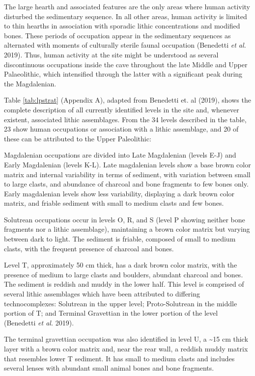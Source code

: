 \documentclass[12pt,twoside]{reedthesis}
\begin{document}
The large hearth and associated features are the only areas where human activity disturbed the sedimentary sequence. In all other areas, human activity is limited to thin hearths in association with sporadic lithic concentrations and modified bones. These periods of occupation appear in the sedimentary sequences as alternated with moments of culturally sterile faunal occupation (Benedetti \emph{et al.} 2019). Thus, human activity at the site might be understood as several discontinuous occupations inside the cave throughout the late Middle and Upper Palaeolithic, which intensified through the latter with a significant peak during the Magdalenian.

Table \ref{tab:lpstrat} (Appendix A), adapted from Benedetti et. al (2019), shows the complete description of all currently identified levels in the site and, whenever existent, associated lithic assemblages. From the 34 levels described in the table, 23 show human occupations or association with a lithic assemblage, and 20 of these can be attributed to the Upper Paleolithic:

Magdalenian occupations are divided into Late Magdalenian (levels E-J) and Early Magdalenian (levels K-L). Late magdalenian levels show a base brown color matrix and internal variability in terms of sediment, with variation between small to large clasts, and abundance of charcoal and bone fragments to few bones only. Early magdalenian levels show less variability, displaying a dark brown color matrix, and friable sediment with small to medium clasts and few bones.

Solutrean occupations occur in levels O, R, and S (level P showing neither bone fragments nor a lithic assemblage), maintaining a brown color matrix but varying between dark to light. The sediment is friable, composed of small to medium clasts, with the frequent presence of charcoal and bones.

Level T, approximately 50 cm thick, has a dark brown color matrix, with the presence of medium to large clasts and boulders, abundant charcoal and bones. The sediment is reddish and muddy in the lower half. This level is comprised of several lithic assemblages which have been attributed to differing technocomplexes: Solutrean in the upper level; Proto-Solutrean in the middle portion of T; and Terminal Gravettian in the lower portion of the level (Benedetti \emph{et al.} 2019).

The terminal gravettian occupation was also identified in level U, a \textasciitilde15 cm thick layer with a brown color matrix and, near the rear wall, a reddish muddy matrix that resembles lower T sediment. It has small to medium clasts and includes several lenses with abundant small animal bones and bone fragments.
\end{document}

